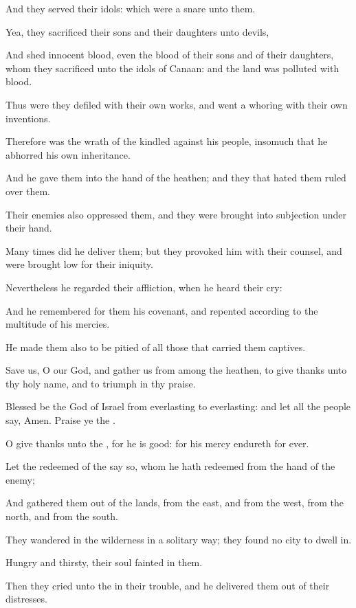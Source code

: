 \Verse And they served their idols: which were a snare unto them.

\Verse Yea, they sacrificed their sons and their daughters unto devils,

\Verse And shed innocent blood, even the blood of their sons and of their daughters, whom they sacrificed unto the idols of Canaan: and the land was polluted with blood.

\Verse Thus were they defiled with their own works, and went a whoring with their own inventions.

\Verse Therefore was the wrath of the \LORD kindled against his people, insomuch that he abhorred his own inheritance.

\Verse And he gave them into the hand of the heathen; and they that hated them ruled over them.

\Verse Their enemies also oppressed them, and they were brought into subjection under their hand.

\Verse Many times did he deliver them; but they provoked him with their counsel, and were brought low for their iniquity.

\Verse Nevertheless he regarded their affliction, when he heard their cry:

\Verse And he remembered for them his covenant, and repented according to the multitude of his mercies.

\Verse He made them also to be pitied of all those that carried them captives.

\Verse Save us, O \LORD our God, and gather us from among the heathen, to give thanks unto thy holy name, and to triumph in thy praise.

\Verse Blessed be the \LORD God of Israel from everlasting to everlasting: and let all the people say, Amen. Praise ye the \LORD.




\Chapter
\Verse O give thanks unto the \LORD, for he is good: for his mercy endureth for ever.

\Verse Let the redeemed of the \LORD say so, whom he hath redeemed from the hand of the enemy;

\Verse And gathered them out of the lands, from the east, and from the west, from the north, and from the south.

\Verse They wandered in the wilderness in a solitary way; they found no city to dwell in.

\Verse Hungry and thirsty, their soul fainted in them.

\Verse Then they cried unto the \LORD in their trouble, and he delivered them out of their distresses.

